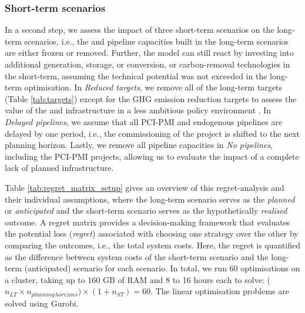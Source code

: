 \documentclass[preprint,12pt,sort&compress]{elsarticle}
\begin{document}
\subsubsection{Short-term scenarios}
\label{sec:short-term_scenarios}
In a second step, we assess the impact of three short-term scenarios on the long-term scenarios, i.e., the  and  pipeline capacities built in the long-term scenarios are either frozen or removed. Further, the model can still react by investing into additional generation, storage, or conversion, or carbon-removal technologies in the short-term, assuming the technical potential was not exceeded in the long-term optimisation. In \textit{Reduced targets}, we remove all of the long-term targets (Table \ref{tab:targets}) except for the GHG emission reduction targets to assess the value of the  and  infrastructure in a less ambitious policy environment \cite{europeancourtofauditorsEUsIndustrialPolicy2024}. In \textit{Delayed pipelines}, we assume that all PCI-PMI and endogenous pipelines are delayed by one period, i.e., the commissioning of the project is shifted to the next planning horizon. Lastly, we remove all pipeline capacities in \textit{No pipelines}, including the PCI-PMI projects, allowing us to evaluate the impact of a complete lack of planned infrastructure. 

Table \ref{tab:regret_matrix_setup} gives an overview of this regret-analysis and their individual assumptions, where the long-term scenario serves as the \textit{planned} or \textit{anticipated} and the short-term scenario serves as the hypothetically \textit{realised} outcome. A regret matrix provides a decision-making framework that evaluates the potential loss (\textit{regret}) associated with choosing one strategy over the other by comparing the outcomes, i.e., the total system costs. Here, the regret is quantified as the difference between system costs of the short-term scenario and the long-term (anticipated) scenario for each scenario. 
In total, we run 60 optimisations on a cluster, taking up to 160 GB of RAM and 8 to 16 hours each to solve: ($n_{LT} \times n_{planning\,horizons}) \times (1+n_{ST}) = 60$. The linear optimisation problems are solved using Gurobi.
\end{document}
